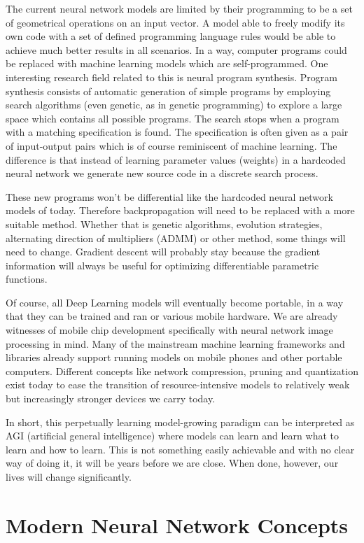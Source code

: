 \documentclass[b5paper]{book}
\begin{document}
The current neural network models are limited by their programming to be a set of geometrical operations on an input vector. A model able to freely modify its own code with a set of defined programming language rules would be able to achieve much better results in all scenarios. In a way, computer programs could be replaced with machine learning models which are self-programmed. One interesting research field related to this is neural program synthesis. Program synthesis consists of automatic generation of simple programs by employing search algorithms (even genetic, as in genetic programming) to explore a large space which contains all possible programs. The search stops when a program with a matching specification is found. The specification is often given as a pair of input-output pairs which is of course reminiscent of machine learning. The difference is that instead of learning parameter values (weights) in a hardcoded neural network we generate new source code in a discrete search process. 

These new programs won't be differential like the hardcoded neural network models of today. Therefore backpropagation will need to be replaced with a more suitable method. Whether that is genetic algorithms, evolution strategies, alternating direction of multipliers (ADMM) or other method, some things will need to change. Gradient descent will probably stay because the gradient information will always be useful for optimizing differentiable parametric functions.

Of course, all Deep Learning models will eventually become portable, in a way that they can be trained and ran or various mobile hardware. We are already witnesses of mobile chip development specifically with neural network image processing in mind. Many of the mainstream machine learning frameworks and libraries already support running models on mobile phones and other portable computers. Different concepts like network compression, pruning and quantization exist today to ease the transition of resource-intensive models to relatively weak but increasingly stronger devices we carry today.

In short, this perpetually learning model-growing paradigm can be interpreted as AGI (artificial general intelligence) where models can learn and learn what to learn and how to learn. This is not something easily achievable and with no clear way of doing it, it will be years before we are close. When done, however, our lives will change significantly.

\section{Modern Neural Network Concepts}
\end{document}
